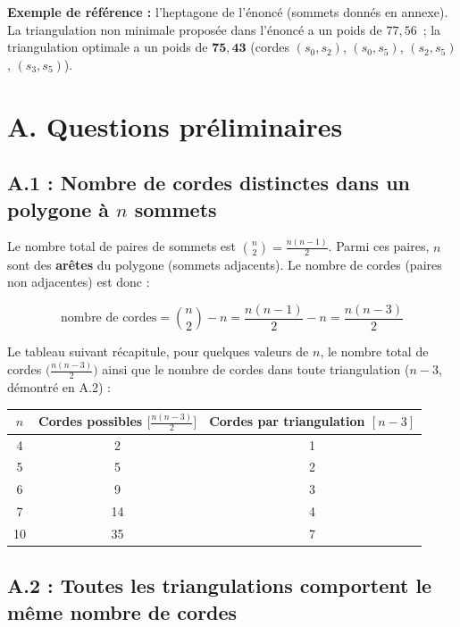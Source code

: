 \documentclass[12pt,a4paper]{article}
\begin{document}
\textbf{Exemple de référence :} l'heptagone de l'énoncé (sommets donnés en annexe).
La triangulation non minimale proposée dans l'énoncé a un poids de $77{,}56$~; la
triangulation optimale a un poids de $\mathbf{75{,}43}$
(cordes $(s_0, s_2)$, $(s_0, s_5)$, $(s_2, s_5)$, $(s_3, s_5)$).

\section{A. Questions préliminaires}

\subsection{A.1 : Nombre de cordes distinctes dans un polygone à \texorpdfstring{$n$}{n} sommets}

Le nombre total de paires de sommets est $\binom{n}{2} = \frac{n(n-1)}{2}$.
Parmi ces paires, $n$ sont des \textbf{arêtes} du polygone (sommets adjacents).
Le nombre de cordes (paires non adjacentes) est donc :

\[
  \text{nombre de cordes} = \binom{n}{2} - n = \frac{n(n-1)}{2} - n = \frac{n(n-3)}{2}
\]

Le tableau suivant récapitule, pour quelques valeurs de $n$, le nombre total de cordes
$\bigl(\tfrac{n(n-3)}{2}\bigr)$ ainsi que le nombre de cordes dans toute triangulation
($n-3$, démontré en A.2) :

\begin{center}
\begin{tabular}{ccc}
\toprule
$n$ & Cordes possibles $\bigl[\tfrac{n(n-3)}{2}\bigr]$ & Cordes par triangulation $[n-3]$ \\
\midrule
  4 &  2 & 1 \\
  5 &  5 & 2 \\
  6 &  9 & 3 \\
  7 & 14 & 4 \\
 10 & 35 & 7 \\
\bottomrule
\end{tabular}
\end{center}

\subsection{A.2 : Toutes les triangulations comportent le même nombre de cordes}
\end{document}
